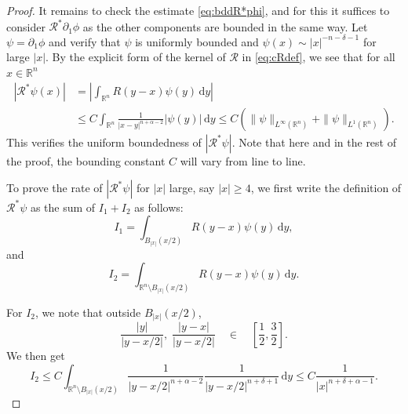 \documentclass[11pt,reqno]{amsart}
\theoremstyle{definition}
\theoremstyle{remark}
\numberwithin{equation}{section}
\newcommand{\R}{{\mathbb{R}}}
\newcommand{\dd}{\mathrm{d}}
\begin{document}
\begin{proof}
It remains to check the estimate \eqref{eq:bddR*phi}, and for this it suffices to consider $\mathcal{R}^*\partial_1 \phi$ as the other components are bounded in the same way. Let $\psi = \partial_1\phi$ and verify that $\psi$ is uniformly bounded and $\psi(x) \sim |x|^{-n-\delta-1}$ for large $|x|$. By the explicit form of the kernel of $\mathcal{R}$ in \eqref{eq:cRdef}, we see that for all $x\in \R^n$
\begin{equation*}
\begin{aligned}
    |\mathcal{R}^*\psi(x)| &= \left|\int_{\R^n} R(y-x)\psi(y)\,\dd y\right|\\ 
    &\le C\int_{\R^n} \frac{1}{|x-y|^{n+\alpha-2}}|\psi(y)|\,\dd y \le C(\|\psi\|_{L^\infty(\R^n)} + \|\psi\|_{L^1(\R^n)}).
    \end{aligned}
\end{equation*}
This verifies the uniform boundedness of $|\mathcal{R}^*\psi|$. Note that here and in the rest of the proof, the bounding constant $C$ will vary from line to line.

To prove the rate of $|\mathcal{R}^*\psi|$  for $|x|$ large, say $|x|\ge 4$, we first write the definition of $\mathcal{R}^*\psi$ as the sum of $I_1+I_2$ as follows:
\begin{equation*}
    I_1 = \int_{B_{|x|}(x/2)} R(y-x)\psi(y)\,\dd y,
\end{equation*}
and
\begin{equation*}
    I_2 = \int_{\R^n\setminus B_{|x|}(x/2)}  R(y-x)\psi(y)\,\dd y.
\end{equation*}

For $I_2$, we note that outside $B_{|x|}(x/2)$, 
\begin{equation*}
    \frac{|y|}{|y-x/2|}, \; \frac{|y-x|}{|y-x/2|} \quad \in \quad [\frac12, \frac32].
\end{equation*}
We then get
\begin{equation*}
    I_2 \le C\int_{\R^n\setminus B_{|x|}(x/2)} \frac{1}{|y-x/2|^{n+\alpha-2}} \frac{1}{|y-x/2|^{n+\delta+1}}\,\dd y \le C\frac{1}{|x|^{n+\delta+\alpha-1}}.
\end{equation*}


\end{proof}
\end{document}
